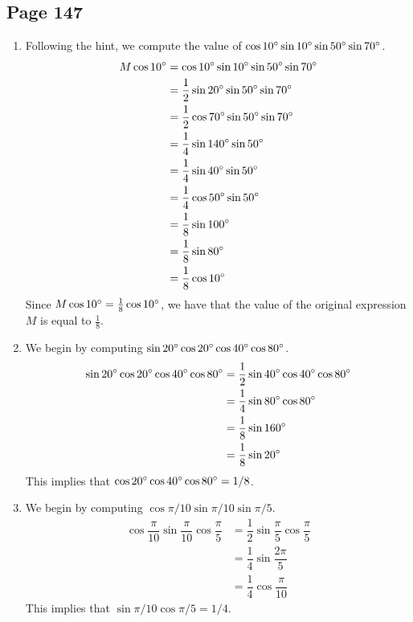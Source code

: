 \documentclass{article}
\newenvironment{solutions}[1]
{\subsection*{#1}
 \begin{enumerate}[leftmargin=1.5em]}
{\end{enumerate}}
\newcommand{\solution}{\item}
\begin{document}
\begin{solutions}{Page 147}
\solution %
Following the hint, we compute the value of $\cos{10\degree}\sin{10\degree}\sin{50\degree}\sin{70\degree}$.
\begin{align*}
M\cos{10\degree} &= \cos{10\degree}\sin{10\degree}\sin{50\degree}\sin{70\degree} \\
&= \dfrac{1}{2}\sin{20\degree}\sin{50\degree}\sin{70\degree} \\
&= \dfrac{1}{2}\cos{70\degree}\sin{50\degree}\sin{70\degree} \\
&= \dfrac{1}{4}\sin{140\degree}\sin{50\degree} \\
&= \dfrac{1}{4}\sin{40\degree}\sin{50\degree} \\
&= \dfrac{1}{4}\cos{50\degree}\sin{50\degree} \\
&= \dfrac{1}{8}\sin{100\degree} \\
&= \dfrac{1}{8}\sin{80\degree} \\
&= \dfrac{1}{8}\cos{10\degree}
\end{align*}
Since $M\cos{10\degree} = \tfrac{1}{8}\cos{10\degree}$, we have that the value of the original expression $M$ is equal to $\tfrac{1}{8}$.

\solution %
We begin by computing $\sin{20\degree}\cos{20\degree}\cos{40\degree}\cos{80\degree}$.
\begin{align*}
\sin{20\degree}\cos{20\degree}\cos{40\degree}\cos{80\degree} &= \dfrac{1}{2}\sin{40\degree}\cos{40\degree}\cos{80\degree} \\
&= \dfrac{1}{4}\sin{80\degree}\cos{80\degree} \\
&= \dfrac{1}{8}\sin{160\degree} \\
&= \dfrac{1}{8}\sin{20\degree}
\end{align*}
This implies that $\cos{20\degree}\cos{40\degree}\cos{80\degree} = 1/8$.
\solution %
We begin by computing $\cos{\pi/10}\sin{\pi/10}\sin{\pi/5}$.
\begin{align*}
\cos{\dfrac{\pi}{10}}\sin{\dfrac{\pi}{10}}\cos{\dfrac{\pi}{5}} &= \dfrac{1}{2}\sin{\dfrac{\pi}{5}}\cos{\dfrac{\pi}{5}} \\
&= \dfrac{1}{4}\sin{\dfrac{2\pi}{5}} \\
&= \dfrac{1}{4}\cos{\dfrac{\pi}{10}}
\end{align*}
This implies that $\sin{\pi/10}\cos{\pi/5} = 1/4$.
\end{solutions}
\end{document}
